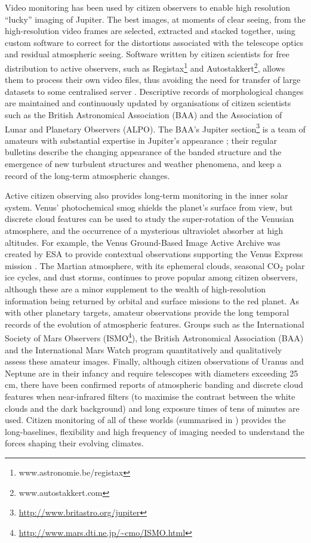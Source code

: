 \documentclass{ar2e}
\begin{document}
Video monitoring has been used by citizen observers to enable high resolution
``lucky'' imaging of Jupiter. The best images, at moments of clear seeing, from
the high-resolution video frames are selected, extracted and stacked together,
using custom software to correct for the distortions associated with the
telescope optics and residual atmospheric seeing.  Software written by citizen
scientists for free distribution to active observers, such as
Registax\footnote{www.astronomie.be/registax} and
Autostakkert\footnote{www.autostakkert.com},  allows them to process their own
video files, thus avoiding the need for transfer of large datasets to some
centralised server \citep[see][for a thorough review]{14mousis_proam}. 
Descriptive records of morphological changes are maintained and continuously
updated by organisations of citizen scientists such as the British Astronomical
Association (BAA) and the Association of Lunar and Planetary Observers (ALPO).
The BAA's Jupiter section\footnote{\url{http://www.britastro.org/jupiter}} is a
team of amateurs with substantial expertise in Jupiter's appearance
\citep{95rogers};  their regular bulletins describe the changing appearance of
the banded structure and the emergence of new turbulent structures and weather
phenomena, and keep a record of the long-term atmospheric changes.  

Active citizen observing also provides long-term monitoring in the inner solar
system.  Venus' photochemical smog shields the planet's surface from view, but
discrete cloud features can be used to study the super-rotation of the Venusian
atmosphere, and the occurrence of a mysterious ultraviolet absorber at high
altitudes.  For example, the Venus Ground-Based Image Active Archive was created
by ESA to provide contextual observations supporting the Venus Express mission
\citep{08barentsen}.  The Martian atmosphere, with its ephemeral clouds,
seasonal CO$_2$ polar ice cycles, and dust storms, continues to prove popular
among citizen observers, although these are a minor supplement to the wealth of
high-resolution information being returned by orbital and surface missions to
the red planet.  As with other planetary targets, amateur observations provide
the long temporal records of the evolution of atmospheric features.  Groups such
as the International Society of Mars Observers
(ISMO\footnote{\url{http://www.mars.dti.ne.jp/~cmo/ISMO.html}}), the British
Astronomical Association (BAA) and the International Mars Watch program
quantitatively and qualitatively assess these amateur images.  Finally, although
citizen observations of Uranus and Neptune are in their infancy and require
telescopes with diameters exceeding 25 cm, there have been confirmed reports of
atmospheric banding and discrete cloud features when near-infrared filters  (to
maximise the contrast between the white clouds and the dark background) and long
exposure times of tens of minutes are used.  Citizen monitoring of all of these
worlds (summarised in ) provides the long-baselines,
flexibility and high frequency of imaging needed to understand the forces
shaping their evolving climates.
\end{document}
